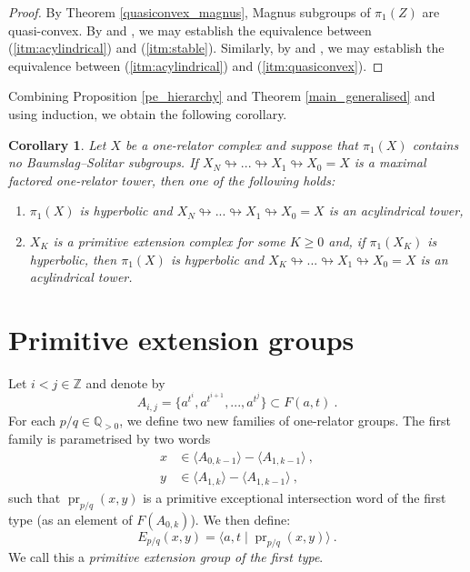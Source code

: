 \documentclass[11pt, a4paper]{amsart}
\newtheorem{corollary}[theorem]{Corollary}
\theoremstyle{definition}
\newcommand{\Z}{\mathbb{Z}}
\newcommand{\Q}{\mathbb{Q}}
\def\immerses{\looparrowright}
\DeclareMathOperator{\pr}{pr}
\begin{document}
\begin{proof}
By Theorem \ref{quasiconvex_magnus}, Magnus subgroups of $\pi_1(Z)$ are quasi-convex. By \cite[Theorem 7.16]{me_22} and \cite[Theorem 13.1]{wise_21_quasiconvex}, we may establish the equivalence between (\ref{itm:acylindrical}) and (\ref{itm:stable}). Similarly, by \cite[Theorem 3.6]{me_22} and \cite[Theorem 13.1]{wise_21_quasiconvex}, we may establish the equivalence between (\ref{itm:acylindrical}) and (\ref{itm:quasiconvex}).
\end{proof}

Combining Proposition \ref{pe_hierarchy} and Theorem \ref{main_generalised} and using induction, we obtain the following corollary.

\begin{corollary}
\label{pe_corollary}
Let $X$ be a one-relator complex and suppose that $\pi_1(X)$ contains no Baumslag--Solitar subgroups.  If $X_N\immerses...\immerses X_1\immerses X_0 = X$ is a maximal factored one-relator tower, then one of the following holds:
\begin{enumerate}
\item $\pi_1(X)$ is hyperbolic and $X_N\immerses...\immerses X_1\immerses X_0 = X$ is an acylindrical tower,
\item $X_K$ is a primitive extension complex for some $K\geq 0$ and, if $\pi_1(X_K)$ is hyperbolic, then $\pi_1(X)$ is hyperbolic and $X_K\immerses...\immerses X_1\immerses X_0 = X$ is an acylindrical tower.
\end{enumerate}
\end{corollary}



\section{Primitive extension groups}
\label{pe_section}

Let $i<j\in \Z$ and denote by 
\[
A_{i, j} = \{a^{t^i}, a^{t^{i+1}}, ..., a^{t^j}\}\subset F(a, t)~. 
\]
For each $p/q\in \Q_{>0}$, we define two new families of one-relator groups. The first family is parametrised by two words 
\begin{align*}
x &\in \langle A_{0, k-1}\rangle - \langle A_{1, k-1}\rangle~,\\
y &\in \langle A_{1, k}\rangle - \langle A_{1, k-1}\rangle~,
\end{align*}
such that $\pr_{p/q}(x, y)$ is a primitive exceptional intersection word of the first type (as an element of $F(A_{0, k})$). We then define:
\begin{equation}
\label{pe_1}
E_{p/q}(x, y) = \langle a, t \mid \pr_{p/q}(x, y)\rangle~.
\end{equation}
We call this a \emph{primitive extension group of the first type}.
\end{document}
